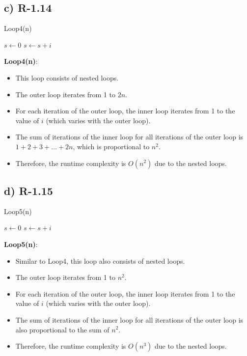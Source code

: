 \documentclass[12pt, letterpaper]{article}
\begin{document}
\subsection{c) R-1.14}
\begin{algorithm}
\caption{Loop4(n)}
\begin{algorithmic}[Hhtbp]
\State $s \gets 0$ 
        \State $s \gets s + i$ 
    \EndFor
\EndFor
\end{algorithmic}
\end{algorithm}
\textbf{Loop4(n)}:
\begin{itemize}
    \item This loop consists of nested loops.
    \item  The outer loop iterates from 1 to \(2n\).
    \item  For each iteration of the outer loop, the inner loop iterates from 1 to the value of \(i\) (which varies with the outer loop).
    \item The sum of iterations of the inner loop for all iterations of the outer loop is \(1 + 2 + 3 + \ldots + 2n\), which is proportional to \(n^2\).
   \item Therefore, the runtime complexity is \(O(n^2)\) due to the nested loops.
\end{itemize}

\subsection{d) R-1.15}
\begin{algorithm}
\caption{Loop5(n)}
\begin{algorithmic}[Hhtbp]
\State $s \gets 0$ 
        \State $s \gets s + i$
    \EndFor
\EndFor
\end{algorithmic}
\end{algorithm}
\textbf{Loop5(n)}:
\begin{itemize}
    \item Similar to Loop4, this loop also consists of nested loops.
    \item  The outer loop iterates from 1 to \(n^2\).
    \item  For each iteration of the outer loop, the inner loop iterates from 1 to the value of \(i\) (which varies with the outer loop).
    \item  The sum of iterations of the inner loop for all iterations of the outer loop is also proportional to the sum of \(n^2\).
    \item Therefore, the runtime complexity is \(O(n^3)\) due to the nested loops.
\end{itemize}
\end{document}
